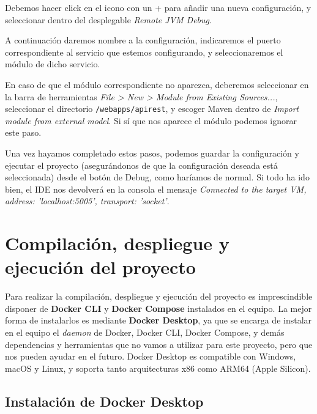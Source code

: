 Debemos hacer click en el icono con un + para añadir una nueva configuración, y seleccionar dentro del desplegable \textit{Remote JVM Debug}.


A continuación daremos nombre a la configuración, indicaremos el puerto correspondiente al servicio que estemos configurando, y seleccionaremos el módulo de dicho servicio.


En caso de que el módulo correspondiente no aparezca, deberemos seleccionar en la barra de herramientas \textit{File > New > Module from Existing Sources...}, seleccionar el directorio \verb,/webapps/apirest,, y escoger Maven dentro de \textit{Import module from external model}. Si sí que nos aparece el módulo podemos ignorar este paso.


Una vez hayamos completado estos pasos, podemos guardar la configuración y ejecutar el proyecto (asegurándonos de que la configuración deseada está seleccionada) desde el botón de Debug, como haríamos de normal. Si todo ha ido bien, el IDE nos devolverá en la consola el mensaje \textit{Connected to the target VM, address: 'localhost:5005', transport: 'socket'}.

\section{Compilación, despliegue y ejecución del proyecto}

Para realizar la compilación, despliegue y ejecución del proyecto es imprescindible disponer de \textbf{Docker CLI} y \textbf{Docker Compose} instalados en el equipo. La mejor forma de instalarlos es mediante \textbf{Docker Desktop}, ya que se encarga de instalar en el equipo el \textit{daemon} de Docker, Docker CLI, Docker Compose, y demás dependencias y herramientas que no vamos a utilizar para este proyecto, pero que nos pueden ayudar en el futuro. Docker Desktop es compatible con Windows, macOS y Linux, y soporta tanto arquitecturas x86 como ARM64 (Apple Silicon).

\subsection{Instalación de Docker Desktop}

